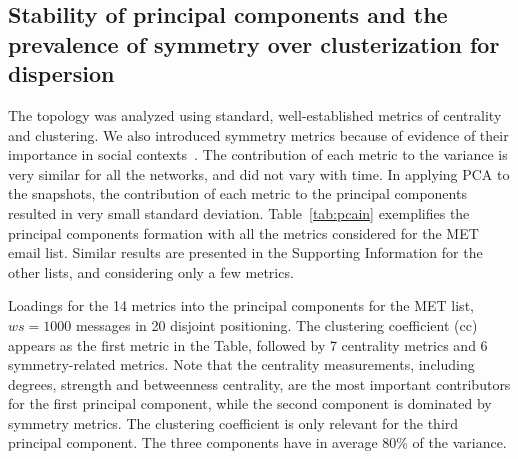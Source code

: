 \documentclass[%
	aip,
	jmp,%
	amsmath,amssymb,
	reprint,%
]{revtex4-1}
\begin{document}
\subsection{Stability of principal components and the prevalence of symmetry over clusterization for dispersion}\label{prevalence}
The topology was analyzed using standard, well-established metrics of centrality and clustering.
We also introduced symmetry metrics because of evidence of their importance in social contexts~\cite{newmanEvolving}.
The contribution of each metric to the variance is very similar for all the networks, and did not vary with time.
In applying PCA to the snapshots, the contribution of each metric to the principal components resulted in very small standard deviation. Table~\ref{tab:pcain} exemplifies the principal components formation with all the metrics considered for the MET email list. Similar results are presented in the Supporting Information for the other lists, and considering only a few metrics.

\begin{table}[!h]
	\caption{Loadings for the 14 metrics into the principal components for the MET list, $ws=1000$ messages in 20 disjoint positioning. The clustering coefficient (cc) appears as the first metric in the Table, followed by 7 centrality metrics and 6 symmetry-related metrics. Note that the centrality measurements, including degrees, strength and betweenness centrality, are the most important contributors for the first principal component, while the second component is dominated by symmetry metrics. The clustering coefficient is only relevant for the third principal component. The three components have in average 80\% of the variance.}
		\footnotesize
		
		\label{tab:pcain}
	\end{table}
\end{document}
